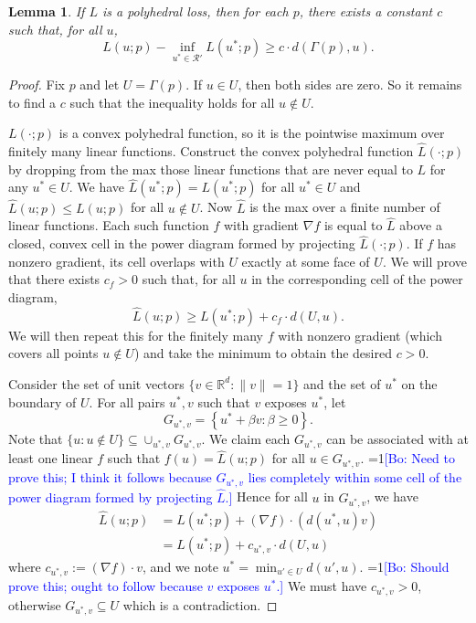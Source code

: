 \documentclass[12pt]{article}
\newcommand{\Comments}{1}
\newcommand{\mynote}[2]{\ifnum\Comments=1\textcolor{#1}{#2}\fi}
\newcommand{\bo}[1]{\mynote{blue}{[Bo: #1]}}
\newcommand{\reals}{\mathbb{R}}
\newcommand{\R}{\mathcal{R}}
\newtheorem{lemma}{Lemma}
\begin{document}
\begin{lemma} \label{lemma:distance-loss}
  If $L$ is a polyhedral loss, then for each $p$, there exists a constant $c$ such that, for all $u$,
    \[ L(u;p) - \inf_{u^* \in \R'} L(u^*;p) \geq c \cdot d(\Gamma(p),u) . \]
\end{lemma}
\begin{proof}
  Fix $p$ and let $U = \Gamma(p)$.
  If $u \in U$, then both sides are zero.
  So it remains to find a $c$ such that the inequality holds for all $u \not\in U$.

  $L(\cdot;p)$ is a convex polyhedral function, so it is the pointwise maximum over finitely many linear functions.
  Construct the convex polyhedral function $\hat{L}(\cdot;p)$ by dropping from the max those linear functions that are never equal to $L$ for any $u^* \in U$.
  We have $\hat{L}(u^*;p) = L(u^*;p)$ for all $u^* \in U$ and $\hat{L}(u;p) \leq L(u;p)$ for all $u \not\in U$.
  Now $\hat{L}$ is the max over a finite number of linear functions.
  Each such function $f$ with gradient $\nabla f$ is equal to $\hat{L}$ above a closed, convex cell in the power diagram formed by projecting $\hat{L}(\cdot;p)$.
  If $f$ has nonzero gradient, its cell overlaps with $U$ exactly at some face of $U$.
  We will prove that there exists $c_f > 0$ such that, for all $u$ in the corresponding cell of the power diagram,
    \[ \hat{L}(u;p) \geq L(u^*;p) + c_f \cdot d(U,u) . \]
  We will then repeat this for the finitely many $f$ with nonzero gradient (which covers all points $u \not\in U$) and take the minimum to obtain the desired $c > 0$.

  Consider the set of unit vectors $\{v \in \reals^d : \|v\|=1\}$ and the set of $u^*$ on the boundary of $U$.
  For all pairs $u^*,v$ such that $v$ exposes $u^*$, let
    \[ G_{u^*,v} = \left\{ u^* + \beta v : \beta \geq 0 \right\} . \]
  Note that $\{ u : u \not\in U\} \subseteq \cup_{u^*,v} G_{u^*,v}$.
  We claim each $G_{u^*,v}$ can be associated with at least one linear $f$ such that $f(u) = \hat{L}(u;p)$ for all $u \in G_{u^*,v}$.
  \bo{Need to prove this; I think it follows because $G_{u^*,v}$ lies completely within some cell of the power diagram formed by projecting $\hat{L}$.}
  Hence for all $u$ in $G_{u^*,v}$, we have
  \begin{align*}
    \hat{L}(u;p) &= \hat{L}(u^*;p) + (\nabla f) \cdot (d(u^*,u) v)  \\
                      &= L(u^*;p) + c_{u^*,v} \cdot d(U,u)
  \end{align*}
  where $c_{u^*,v} := (\nabla f) \cdot v$, and we note $u^* = \min_{u' \in U} d(u',u)$. \bo{Should prove this; ought to follow because $v$ exposes $u^*$.}
  We must have $c_{u^*,v} > 0$, otherwise $G_{u^*,v} \subseteq U$ which is a contradiction.


\end{proof}
\end{document}
